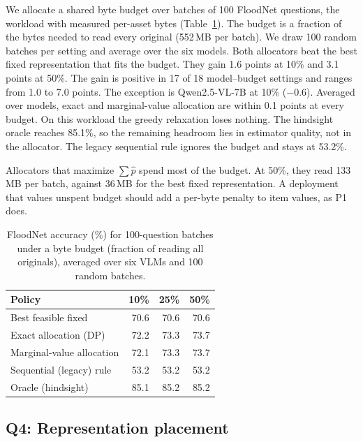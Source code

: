 \documentclass[10pt,conference]{IEEEtran}
\newcommand{\tableformat}{\footnotesize\setlength{\tabcolsep}{3pt}\renewcommand{\arraystretch}{0.95}}
\newcommand{\mQSev}{Qwen2.5-VL-7B\xspace}
\begin{document}
We allocate a shared byte budget over batches of 100 FloodNet questions, the
workload with measured per-asset bytes (Table~\ref{tab:mission}). The budget is
a fraction of the bytes needed to read every original (552\,MB per batch). We
draw 100 random batches per setting and average over the six models.
Both allocators beat the best fixed representation that fits the budget. They
gain 1.6 points at 10\% and 3.1 points at 50\%. The gain is positive in 17 of
18 model--budget settings and ranges from 1.0 to 7.0 points. The exception is
\mQSev at 10\% ($-$0.6). Averaged over models, exact and marginal-value
allocation are within 0.1 points at every budget. On this workload the greedy
relaxation loses nothing. The hindsight oracle reaches 85.1\%, so the remaining headroom
lies in estimator quality, not in the allocator. The legacy sequential rule
ignores the budget and stays at 53.2\%.

Allocators that maximize $\sum\widehat p$ spend most of the budget. At 50\%,
they read 133\,MB per batch, against 36\,MB for the best fixed representation.
A deployment that values unspent budget should add a per-byte penalty
to item values, as P1 does.

\begin{table}[t]
\centering
\tableformat
\caption{FloodNet accuracy (\%) for 100-question batches under a byte budget
(fraction of reading all originals), averaged over six VLMs and 100 random
batches.}
\label{tab:mission}
\begin{tabular}{lrrr}
\toprule
Policy & 10\% & 25\% & 50\% \\
\midrule
Best feasible fixed        & 70.6 & 70.6 & 70.6 \\
Exact allocation (DP)      & 72.2 & 73.3 & 73.7 \\
Marginal-value allocation  & 72.1 & 73.3 & 73.7 \\
Sequential (legacy) rule   & 53.2 & 53.2 & 53.2 \\
Oracle (hindsight)         & 85.1 & 85.2 & 85.2 \\
\bottomrule
\end{tabular}
\end{table}

\subsection{Q4: Representation placement}
\end{document}
